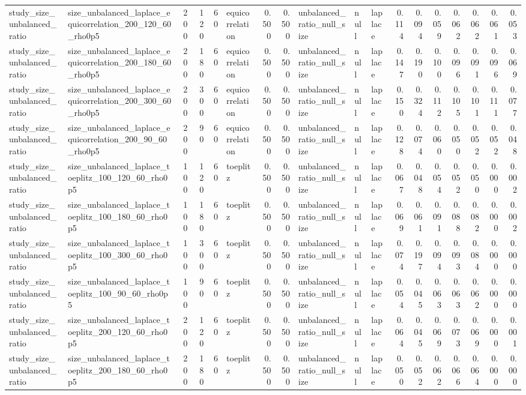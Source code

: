 \begin{tabular}{llrrrlrrlllrrrrrrr}
study\_size\_unbalanced\_ratio & size\_unbalanced\_laplace\_equicorrelation\_200\_120\_60\_rho0p5 & 200 & 120 & 60 & equicorrelation & 0.500 & 0.500 & unbalanced\_ratio\_null\_size & null & laplace & 0.114 & 0.094 & 0.059 & 0.062 & 0.062 & 0.061 & 0.053 \\
study\_size\_unbalanced\_ratio & size\_unbalanced\_laplace\_equicorrelation\_200\_180\_60\_rho0p5 & 200 & 180 & 60 & equicorrelation & 0.500 & 0.500 & unbalanced\_ratio\_null\_size & null & laplace & 0.147 & 0.190 & 0.100 & 0.096 & 0.091 & 0.096 & 0.069 \\
study\_size\_unbalanced\_ratio & size\_unbalanced\_laplace\_equicorrelation\_200\_300\_60\_rho0p5 & 200 & 300 & 60 & equicorrelation & 0.500 & 0.500 & unbalanced\_ratio\_null\_size & null & laplace & 0.150 & 0.324 & 0.112 & 0.105 & 0.101 & 0.111 & 0.077 \\
study\_size\_unbalanced\_ratio & size\_unbalanced\_laplace\_equicorrelation\_200\_90\_60\_rho0p5 & 200 & 90 & 60 & equicorrelation & 0.500 & 0.500 & unbalanced\_ratio\_null\_size & null & laplace & 0.128 & 0.074 & 0.060 & 0.050 & 0.052 & 0.052 & 0.048 \\
study\_size\_unbalanced\_ratio & size\_unbalanced\_laplace\_toeplitz\_100\_120\_60\_rho0p5 & 100 & 120 & 60 & toeplitz & 0.500 & 0.500 & unbalanced\_ratio\_null\_size & null & laplace & 0.067 & 0.048 & 0.054 & 0.052 & 0.050 & 0.000 & 0.002 \\
study\_size\_unbalanced\_ratio & size\_unbalanced\_laplace\_toeplitz\_100\_180\_60\_rho0p5 & 100 & 180 & 60 & toeplitz & 0.500 & 0.500 & unbalanced\_ratio\_null\_size & null & laplace & 0.069 & 0.061 & 0.091 & 0.088 & 0.082 & 0.000 & 0.002 \\
study\_size\_unbalanced\_ratio & size\_unbalanced\_laplace\_toeplitz\_100\_300\_60\_rho0p5 & 100 & 300 & 60 & toeplitz & 0.500 & 0.500 & unbalanced\_ratio\_null\_size & null & laplace & 0.074 & 0.197 & 0.094 & 0.093 & 0.084 & 0.000 & 0.000 \\
study\_size\_unbalanced\_ratio & size\_unbalanced\_laplace\_toeplitz\_100\_90\_60\_rho0p5 & 100 & 90 & 60 & toeplitz & 0.500 & 0.500 & unbalanced\_ratio\_null\_size & null & laplace & 0.054 & 0.045 & 0.063 & 0.063 & 0.062 & 0.000 & 0.000 \\
study\_size\_unbalanced\_ratio & size\_unbalanced\_laplace\_toeplitz\_200\_120\_60\_rho0p5 & 200 & 120 & 60 & toeplitz & 0.500 & 0.500 & unbalanced\_ratio\_null\_size & null & laplace & 0.064 & 0.045 & 0.069 & 0.073 & 0.069 & 0.000 & 0.001 \\
study\_size\_unbalanced\_ratio & size\_unbalanced\_laplace\_toeplitz\_200\_180\_60\_rho0p5 & 200 & 180 & 60 & toeplitz & 0.500 & 0.500 & unbalanced\_ratio\_null\_size & null & laplace & 0.050 & 0.052 & 0.062 & 0.066 & 0.064 & 0.000 & 0.000 \\

\end{tabular}
